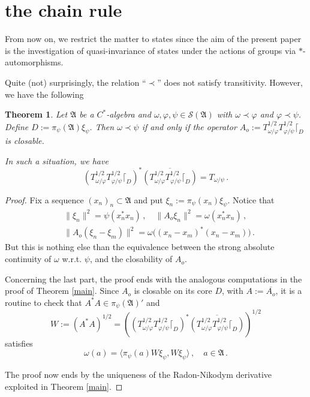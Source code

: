 \documentclass[12pt]{amsart}
\numberwithin{equation}{section}
\def\cs{{\mathcal S}}
\def\ga{{\mathfrak A}} \def\gpa{{\mathfrak a}}
\def\f{\varphi}\def\ff{\phi} \def\F{\Phi}
\def\om{\omega} \def\Om{\Omega}
\newtheorem{thm}{Theorem}[section]
\begin{document}
\section{the chain rule}
\label{secmain2}

From now on, we restrict the matter to states since the aim of the present paper is the investigation of quasi-invariance of states under the actions of groups via $*$-automorphisms.

Quite (not) surprisingly, the relation ``$\prec$'' does not satisfy transitivity. However, we have the following
\begin{thm}
\label{notrans}
Let $\ga$ be a $C^*$-algebra and $\om,\f,\psi\in\cs(\ga)$ with $\om\prec\f$ and $\f\prec\psi$. Define $D:=\pi_\psi(\ga)\xi_\psi$.
Then $\om\prec\psi$ if and only if the operator $A_o:=T^{1/2}_{\om/\f}T^{1/2}_{\f/\psi}\lceil_D$ is closable. 

In such a situation, we have
\begin{equation}
\label{redj}
\left(T^{1/2}_{\om/\f}T^{1/2}_{\f/\psi}\lceil_D\right)^*\overline{\left(T^{1/2}_{\om/\f}T^{1/2}_{\f/\psi}\lceil_D\right)}=T_{\om/\psi}\,.
\end{equation}
\end{thm}
\begin{proof}
Fix a sequence $(x_n)_n\subset\ga$ and put $\xi_n:=\pi_\psi(x_n)\xi_\psi$. Notice that
\begin{align*}
&\|\xi_n\|^2=\psi(x_n^*x_n)\,,\quad \|A_o\xi_n\|^2=\om(x_n^*x_n)\,,\\
&\|A_o(\xi_n-\xi_m)\|^2=\om\big((x_n-x_m)^*(x_n-x_m)\big)\,.
\end{align*}
But this is nothing else than the equivalence between the strong absolute continuity of $\om$ w.r.t. $\psi$, and the closability of $A_o$.

Concerning the last part, the proof ends with the analogous computations in the proof of Theorem \ref{main}. Since $A_o$ is closable on its core $D$,
with $A:=\overline{A_o}$, it is a routine to check that  $A^*A\in\pi_\psi(\ga)'$ and 
$$
W:=(A^*A)^{1/2}=\left(\left(T^{1/2}_{\om/\f}T^{1/2}_{\f/\psi}\lceil_D\right)^*\overline{\left(T^{1/2}_{\om/\f}T^{1/2}_{\f/\psi}\lceil_D\right)}\right)^{1/2}
$$
satisfies 
$$
\om(a)=\langle\pi_\psi(a)W\xi_\psi,W\xi_\psi\rangle\,,\quad a\in\ga\,.
$$

The proof now ends by the uniqueness of the Radon-Nikodym derivative exploited in Theorem \ref{main}.
\end{proof}
\end{document}
